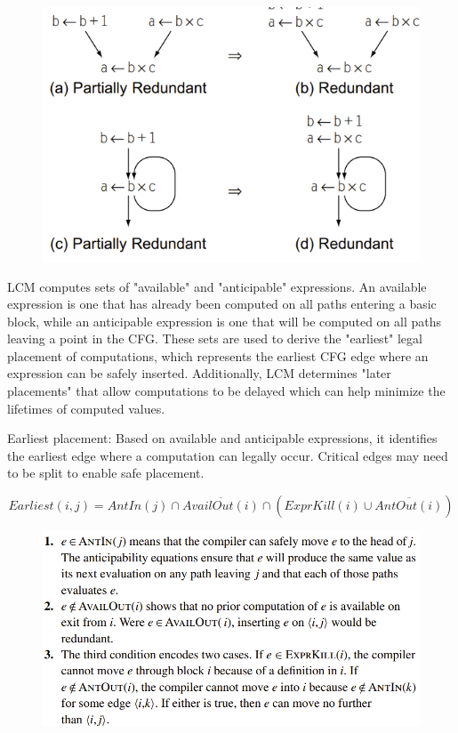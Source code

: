 \documentclass[11pt, a4paper, titlepage]{article}
\begin{document}
\begin{figure}[H]
  \centering
  \includegraphics[scale=0.4]{images/r14.png}
\end{figure}

LCM computes sets of "available" and "anticipable" expressions. An available expression is one that has already been computed on all paths entering a basic block, while an anticipable expression is one that will be computed on all paths leaving a point in the CFG. These sets are used to derive the "earliest" legal placement of computations, which represents the earliest CFG edge where an expression can be safely inserted. Additionally, LCM determines "later placements" that allow computations to be delayed which can help minimize the lifetimes of computed values.

Earliest placement: Based on available and anticipable expressions, it identifies the earliest edge where a computation can legally occur. Critical edges may need to be split to enable safe placement. 

\[Earliest(i, j) = AntIn(j) \cap \overline{AvailOut(i)} \cap (ExprKill(i) \cup \overline{AntOut(i)})\]

\begin{figure}[H]
  \centering
  \includegraphics[scale=0.4]{images/r15.png}
\end{figure}
\end{document}
